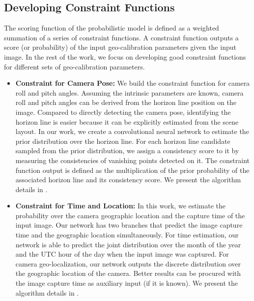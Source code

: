 \subsection{Developing Constraint Functions}
The scoring function of the probabilistic
model is defined as a weighted summation of a series of constraint
functions.
A constraint function outputs a score (or probability) of the input
geo-calibration parameters given the input image. In the rest of the
work, we focus on developing good constraint functions for different
sets of geo-calibration parameters. 

\begin{itemize}[noitemsep]
  \item \textbf{Constraint for Camera Pose:}
  We build the constraint function for camera roll and pitch angles.
  Assuming the intrinsic parameters are known, camera roll and pitch
  angles can be derived from the horizon line position on the image.
  Compared to directly detecting the camera pose, identifying the horizon
  line is easier because it can be explicitly estimated from the scene
  layout.
  In our work, we create a convolutional neural network to estimate the
  prior distribution over the horizon line.
  For each horizon line candidate sampled from the prior distribution,
  we assign a consistency score to it by measuring the consistencies of
  vanishing points detected on it.
  The constraint function output is defined as the multiplication of
  the prior probability of the associated horizon line and its
  consistency score.
  We present the algorithm details in .
  \newline

  \item \textbf{Constraint for Time and Location:}
  In this work, we estimate the probability over 
  the camera geographic location and the capture time of the input
  image.
  Our network has two branches that predict the image
  capture time and the geographic location simultaneously.
  For time estimation, our network is able to predict the
  joint distribution over the month of the year and the UTC hour of the
  day when the input image was captured.
  For camera geo-localization, our network outputs the discrete
  distribution over the geographic location of the camera. Better
  results can be procured with the image capture time as auxiliary input
  (if it is known).  
  We present the algorithm details in .
  \newline


\end{itemize}
